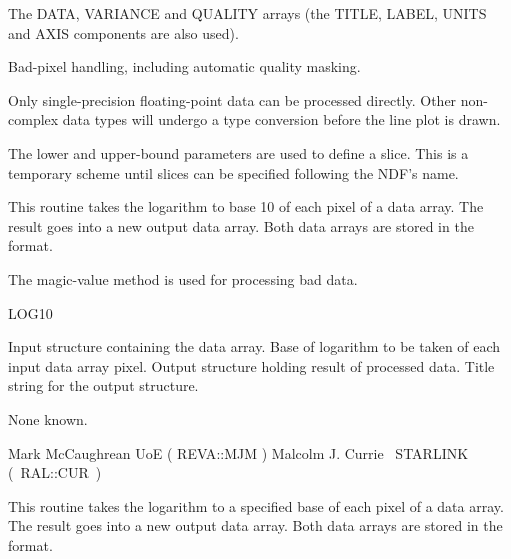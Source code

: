 {{{{         \sstitem
         The DATA, VARIANCE and QUALITY arrays (the TITLE, LABEL, UNITS
         and AXIS components are also used).

         \sstitem
         Bad-pixel handling, including automatic quality masking.

         \sstitem
         Only single-precision floating-point data can be processed
         directly.  Other non-complex data types will undergo a type
         conversion before the line plot is drawn.

         \sstitem
         The lower and upper-bound parameters are used to define a
         slice.  This is a temporary scheme until slices can be specified
         following the NDF's name.
      }
   }
}

\begin{manroutinedescription}
  This routine takes the logarithm to base 10 of each pixel of
  a data array. The result goes into a new output data array.
  Both data arrays are stored in the {} format.

  The magic-value method is used for processing bad data.

  LOG10

\newpage
{}
\begin{manparametertable}
  Input {} structure containing the data array.
  Base of logarithm to be taken of each input data array pixel.
  {\mantt [10]}
  Output {} structure holding result of processed data.
  Title string for the output {} structure. \mbox{}
\end{manparametertable}
  None known.

  Mark McCaughrean UoE ( {\mantt REVA}::{\mantt MJM} )
  Malcolm J. Currie ~STARLINK \mbox{( {\mantt RAL}::{\mantt CUR} )}
\end{manroutinedescription}

\begin{manroutinedescription}
  This routine takes the logarithm to a specified base of each
  pixel of a data array. The result goes into a new output data
  array. Both data arrays are stored in the {} format.


\end{manroutinedescription}}
